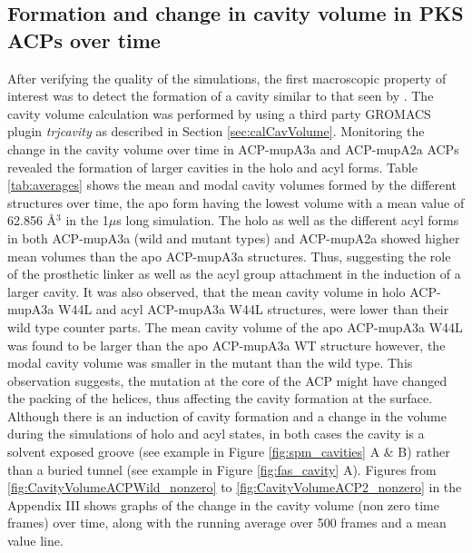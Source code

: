 \clearpage
\newpage	 	 
	\subsection{Formation and change in cavity volume in PKS ACPs over time}
	\label{sec:cavvolume}
	After verifying the quality of the simulations, the first macroscopic property of interest was to detect the formation of a cavity similar to that seen by \textcite{Chan2008}. The cavity volume calculation was performed by using a third party GROMACS plugin \textit{trj\textunderscore cavity} as described in Section \ref{sec:calCavVolume}. Monitoring the change in the cavity volume over time in ACP-mupA3a and ACP-mupA2a ACPs revealed the formation of larger cavities in the holo and acyl forms. Table \ref{tab:averages} shows the mean and  modal cavity volumes formed by the different structures over time, the apo form having the lowest volume with a mean value of 62.856 \AA$ ^{3} $ in the 1$ \mu $s long simulation. The holo as well as the different acyl forms in both ACP-mupA3a (wild and mutant types) and ACP-mupA2a showed higher mean volumes than the apo ACP-mupA3a structures. Thus, suggesting the role of the prosthetic linker as well as the acyl group attachment in the induction of a larger cavity. It was also observed, that the mean cavity volume in holo ACP-mupA3a W44L and acyl ACP-mupA3a W44L structures, were lower than their wild type counter parts. The mean cavity volume of the apo ACP-mupA3a W44L was found to be larger than the apo ACP-mupA3a WT structure however, the modal cavity volume was smaller in the mutant than the wild type. This observation suggests, the mutation at the core of the ACP might have changed the packing of the helices, thus affecting the cavity formation at the surface. Although there is an induction of cavity formation and a change in the volume during the simulations of holo and acyl states, in both cases the cavity is a solvent exposed groove (see example in Figure \ref{fig:spm_cavities} A \& B) rather than a buried tunnel (see example in Figure \ref{fig:fas_cavity} A). Figures from \ref{fig:CavityVolumeACPWild_nonzero} to \ref{fig:CavityVolumeACP2_nonzero} in the Appendix III shows graphs of the change in the cavity volume (non zero time frames) over time, along with the running average over 500 frames and a mean value line. 
	
